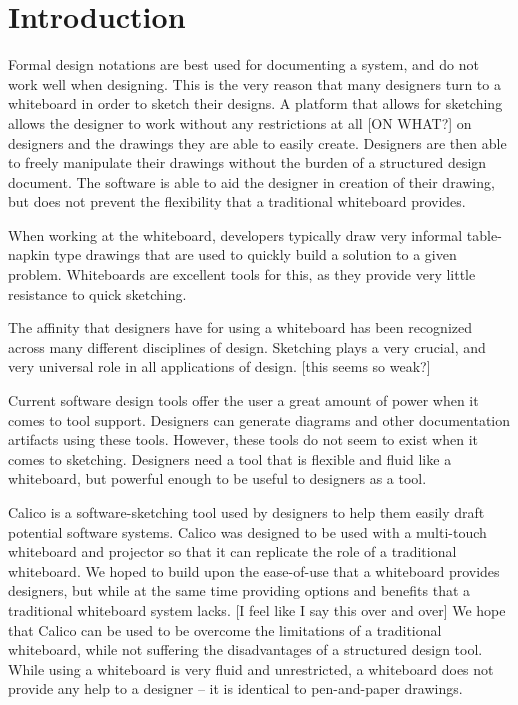 \chapter{Introduction}

Formal design notations are best used for documenting a system, and do not work well when designing. This is the very reason that many designers turn to a whiteboard in order to sketch their designs. A platform that allows for sketching allows the designer to work without any restrictions at all [ON WHAT?] on designers and the drawings they are able to easily create. Designers are then able to freely manipulate their drawings without the burden of a structured design document. The software is able to aid the designer in creation of their drawing, but does not prevent the flexibility that a traditional whiteboard provides.  

When working at the whiteboard, developers typically draw very informal table-napkin type drawings that are used to quickly build a solution to a given problem. Whiteboards are excellent tools for this, as they provide very little resistance to quick sketching. 

The affinity that designers have for using a whiteboard has been recognized across many different disciplines of design. Sketching plays a very crucial, and very universal role in all applications of design. [this seems so weak?]

Current software design tools offer the user a great amount of power when it comes to tool support. Designers can generate diagrams and other documentation artifacts using these tools. However, these tools do not seem to exist when it comes to sketching. Designers need a tool that is flexible and fluid like a whiteboard, but powerful enough to be useful to designers as a tool.  

Calico is a software-sketching tool used by designers to help them easily draft potential software systems. Calico was designed to be used with a multi-touch whiteboard and projector so that it can replicate the role of a traditional whiteboard. We hoped to build upon the ease-of-use that a whiteboard provides designers, but while at the same time providing options and benefits that a traditional whiteboard system lacks. [I feel like I say this over and over] We hope that Calico can be used to be overcome the limitations of a traditional whiteboard, while not suffering the disadvantages of a structured design tool. While using a whiteboard is very fluid and unrestricted, a whiteboard does not provide any help to a designer – it is identical to pen-and-paper drawings. 

